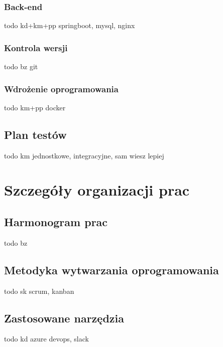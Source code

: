 \documentclass{article}
\begin{document}
	\subsubsection{Back-end}	
	todo kd+km+pp springboot, mysql, nginx	
	
	\subsubsection{Kontrola wersji}
	todo bz git
	  
	\subsubsection{Wdrożenie oprogramowania}
	todo km+pp docker
	  
	\subsection{Plan testów}
	todo km jednostkowe, integracyjne, sam wiesz lepiej
 
	\section{Szczegóły organizacji prac}  
 
	\subsection{Harmonogram prac}
	todo bz
 
	\subsection{Metodyka wytwarzania oprogramowania}
	todo sk scrum, kanban
	
	\subsection{Zastosowane narzędzia}
	todo kd azure devops, slack
 
\end{document}
